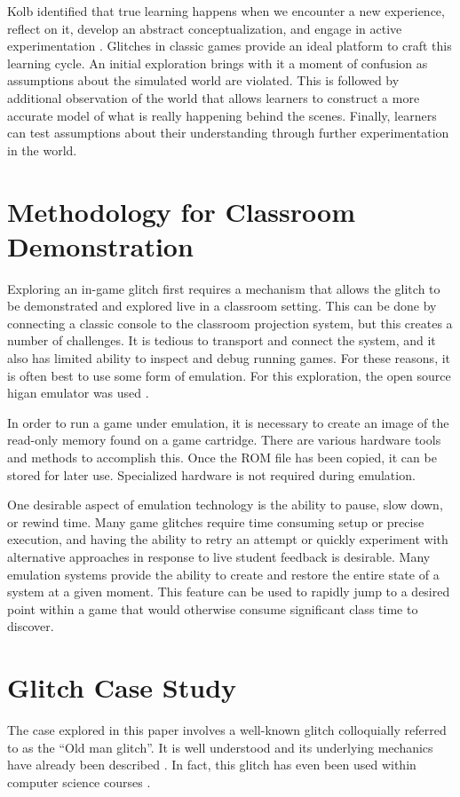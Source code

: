 \documentclass[letterpaper]{article}
\begin{document}
Kolb identified that true learning happens when we encounter a new experience, reflect on it, develop an abstract conceptualization, and engage in active experimentation \cite{kolb84}. Glitches in classic games provide an ideal platform to craft this learning cycle. An initial exploration brings with it a moment of confusion as assumptions about the simulated world are violated. This is followed by additional observation of the world that allows learners to construct a more accurate model of what is really happening behind the scenes. Finally, learners can test assumptions about their understanding through further experimentation in the world.

\section{Methodology for Classroom Demonstration}

Exploring an in-game glitch first requires a mechanism that allows the glitch to be demonstrated and explored live in a classroom setting. This can be done by connecting a classic console to the classroom projection system, but this creates a number of challenges. It is tedious to transport and connect the system, and it also has limited ability to inspect and debug running games. For these reasons, it is often best to use some form of emulation. For this exploration, the open source higan emulator was used \cite{ginder2004higan}.

In order to run a game under emulation, it is necessary to create an image of the read-only memory found on a game cartridge. There are various hardware tools and methods to accomplish this. Once the ROM file has been copied, it can be stored for later use. Specialized hardware is not required during emulation.

One desirable aspect of emulation technology is the ability to pause, slow down, or rewind time. Many game glitches require time consuming setup or precise execution, and having the ability to retry an attempt or quickly experiment with alternative approaches in response to live student feedback is desirable. Many emulation systems provide the ability to create and restore the entire state of a system at a given moment. This feature can be used to rapidly jump to a desired point within a game that would otherwise consume significant class time to discover.

\section{Glitch Case Study}
The case explored in this paper involves a well-known glitch colloquially referred to as the ``Old man glitch''. It is well understood and its underlying mechanics have already been described \cite{bulbapedia2005} \cite{scrumpy2016missing}. In fact, this glitch has even been used within computer science courses \cite{rjwalls2022}.
\end{document}
